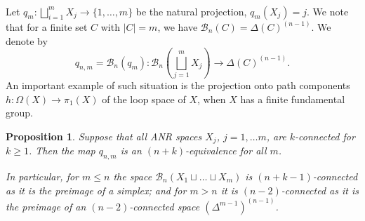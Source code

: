 \documentclass{amsart}
\numberwithin{equation}{section}
\theoremstyle{plain}
\newtheorem{prop}[thm]{Proposition}
\theoremstyle{definition}
\begin{document}
\

Let $q_m:\bigsqcup_{i=1}^mX_j\to\{1,\dots, m\}$ be the natural projection, $q_m(X_j)=j$. We note that for a finite set $C$ with $|C|=m$, we have $\mathcal B_n(C)=\Delta(C)^{(n-1)}$.
We denote by $$q_{n,m}=\mathcal B_n(q_m):\mathcal B_n(\bigsqcup_{j=1}^mX_j)\to\Delta(C)^{(n-1)}.$$
An important example of such situation is the projection onto path components $h:\Omega(X)\to\pi_1(X)$ of the loop space of $X$, when $X$ has a  finite fundamental group.

\begin{prop}\label{connectivity}
Suppose that all  ANR spaces $X_j$, $j=1,\dots m$, are $k$-connected for $k\ge 1$. Then the map $q_{n,m}$ is an $(n+k)$-equivalence for all $m$.

In particular, for $m\le n$ the space $\mathcal  B_n(X_1\sqcup\dots\sqcup X_m)$ is $(n+k-1)$-connected as it is the preimage of  a simplex; and   for $m>n$ it is $(n-2)$-connected as it is the preimage of an $(n-2)$-connected space $(\Delta^{m-1})^{(n-1)}$.
\end{prop}
\end{document}

